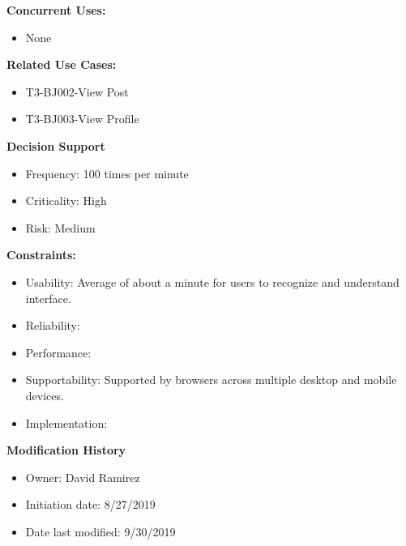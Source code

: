 \textbf{Concurrent Uses:}
\begin{itemize}
    \item None
\end{itemize}
\textbf{Related Use Cases:}
\begin{itemize}
    \item T3-BJ002-View Post
    \item T3-BJ003-View Profile
\end{itemize}
\textbf{Decision Support}
\begin{itemize}
    \item Frequency: 100 times per minute
    \item Criticality: High
    \item Risk: Medium
\end{itemize}
\textbf{Constraints:}
\begin{itemize}
    \item Usability: Average of about a minute for users to recognize and understand interface.
    \item Reliability: 
    \item Performance:
    \item Supportability: Supported by browsers across multiple desktop and mobile devices.
    \item Implementation:
\end{itemize}
\textbf{Modification History}
\begin{itemize}
    \item Owner: David Ramirez
    \item Initiation date: 8/27/2019
    \item Date last modified: 9/30/2019
\end{itemize}